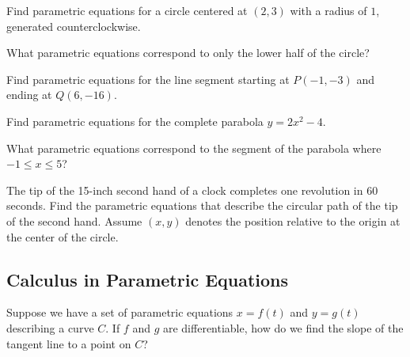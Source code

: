 \documentclass[12pt]{article}
\begin{document}
\Example Find parametric equations for a circle centered at $(2,3)$ with a radius of $1$, generated counterclockwise. 

\vfill

What parametric equations correspond to only the lower half of the circle?

\vspace{30mm}

\newpage


\Example Find parametric equations for the line segment starting at $P(-1,-3)$ and ending at $Q(6,-16)$.

\vfill

\vfill

\Example Find parametric equations for the complete parabola $y=2x^2-4$. 

\vspace{45mm}

What parametric equations correspond to the segment of the parabola where $-1\leq x\leq 5$?

\vspace{30mm}

\newpage

\Example The tip of the 15-inch second hand of a clock completes one revolution in 60 seconds. Find the parametric equations that describe the circular path of the tip of the second hand. Assume $(x,y)$ denotes the position relative to the origin at the center of the circle.

\vfill

\subsection*{Calculus in Parametric Equations}

Suppose we have a set of parametric equations $x=f(t)$ and $y=g(t)$ describing a curve $C$. If $f$ and $g$ are differentiable, how do we find the slope of the tangent line to a point on $C$?

\vspace{5mm}

\end{document}
